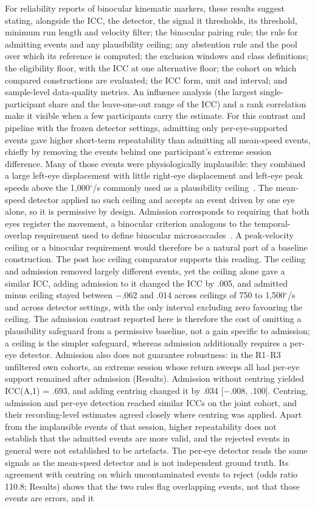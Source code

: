 For reliability reports of binocular kinematic markers, these results suggest stating, alongside the ICC, the detector, the signal it thresholds, its threshold, minimum run length and velocity filter; the binocular pairing rule; the rule for admitting events and any plausibility ceiling; any abstention rule and the pool over which its reference is computed; the exclusion windows and class definitions; the eligibility floor, with the ICC at one alternative floor; the cohort on which compared constructions are evaluated; the ICC form, unit and interval; and sample-level data-quality metrics. An influence analysis (the largest single-participant share and the leave-one-out range of the ICC) and a rank correlation make it visible when a few participants carry the estimate. For this contrast and pipeline with the frozen detector settings, admitting only per-eye-supported events gave higher short-term repeatability than admitting all mean-speed events, chiefly by removing the events behind one participant's extreme session difference. Many of those events were physiologically implausible: they combined a large left-eye displacement with little right-eye displacement and left-eye peak speeds above the 1,000$^\circ$/s commonly used as a plausibility ceiling~\citep{nystrom2010}. The mean-speed detector applied no such ceiling and accepts an event driven by one eye alone, so it is permissive by design. Admission corresponds to requiring that both eyes register the movement, a binocular criterion analogous to the temporal-overlap requirement used to define binocular microsaccades~\citep{engbert2003}. A peak-velocity ceiling or a binocular requirement would therefore be a natural part of a baseline construction. The post hoc ceiling comparator supports this reading. The ceiling and admission removed largely different events, yet the ceiling alone gave a similar ICC, adding admission to it changed the ICC by .005, and admitted minus ceiling stayed between $-$.062 and .014 across ceilings of 750 to 1,500$^\circ$/s and across detector settings, with the only interval excluding zero favouring the ceiling. The admission contrast reported here is therefore the cost of omitting a plausibility safeguard from a permissive baseline, not a gain specific to admission; a ceiling is the simpler safeguard, whereas admission additionally requires a per-eye detector. Admission also does not guarantee robustness: in the R1--R3 unfiltered own cohorts, an extreme session whose return sweeps all had per-eye support remained after admission (Results). Admission without centring yielded ICC(A,1) = .693, and adding centring changed it by .034 [$-$.008, .100]. Centring, admission and per-eye detection reached similar ICCs on the joint cohort, and their recording-level estimates agreed closely where centring was applied. Apart from the implausible events of that session, higher repeatability does not establish that the admitted events are more valid, and the rejected events in general were not established to be artefacts. The per-eye detector reads the same signals as the mean-speed detector and is not independent ground truth. Its agreement with centring on which uncontaminated events to reject (odds ratio 110.8; Results) shows that the two rules flag overlapping events, not that those events are errors, and it 